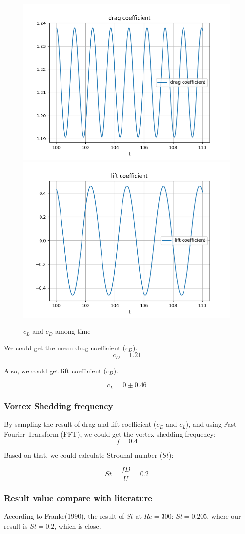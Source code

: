 \documentclass[12pt]{article}
\begin{document}
\begin{figure}[H]
    \centering
    \includegraphics[width=0.45\linewidth]{figure/Analysis/N32_Re300_8x4/cd_N32_Re300_8x4.jpg}
    \includegraphics[width=0.45\linewidth]{figure/Analysis/N32_Re300_8x4/cl_N32_Re300_8x4.jpg}
    \caption{$c_L$ and $c_D$ among time}
\end{figure}

We could get the mean drag coefficient ($c_D$):
$$c_D = 1.21$$


Also, we could get lift coefficient ($c_D$):

$$c_L = 0 \pm 0.46$$



\subsubsection{Vortex Shedding frequency}

By sampling the result of drag and lift coefficient ($c_D$ and $c_L$), and using Fast Fourier Transform (FFT), we could get the vortex shedding frequency:
$$f = 0.4$$

Based on that, we could calculate Strouhal number ($St$):

$$St = \frac{f D}{U} = 0.2 $$


\subsubsection{Result value compare with literature}

According to Franke(1990)\cite{FRANKE1990237}, the result of $St$ at $Re=300$: $St = 0.205$, where our result is $St = 0.2$, which is close.
\end{document}
